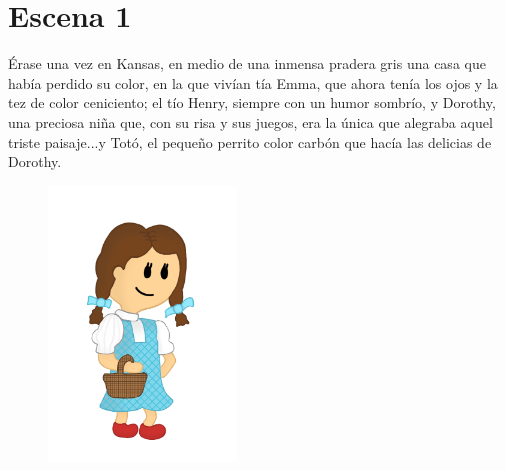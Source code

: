 \chapter{Escena 1}

Érase una vez en Kansas, en medio de una inmensa pradera gris una casa que había perdido su color, en la que vivían tía Emma, que ahora tenía los ojos y la tez de color ceniciento; el tío Henry, siempre con un humor sombrío, y Dorothy, una preciosa niña que, con su risa y sus juegos, era la única que alegraba aquel triste paisaje...y Totó, el pequeño perrito color carbón que hacía las delicias de Dorothy.
\begin{figure}[b!]
	\includegraphics[width=5cm]{./../imagenes/dorothy.png}
	\centering
\end{figure}




